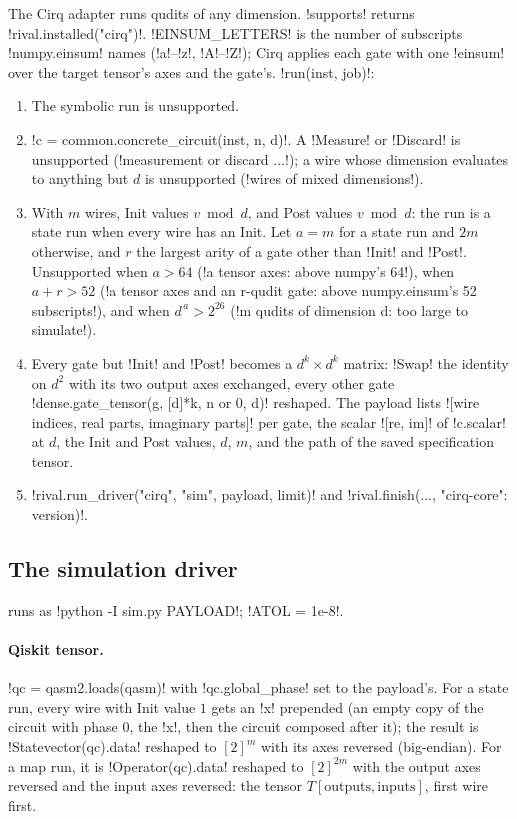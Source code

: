 The Cirq adapter runs qudits of any dimension. \py!supports! returns \py!rival.installed("cirq")!. \py!EINSUM_LETTERS! is the number of subscripts \py!numpy.einsum! names (\code!a!--\code!z!, \code!A!--\code!Z!); Cirq applies each gate with one \code!einsum! over the target tensor's axes and the gate's. \py!run(inst, job)!:
\begin{enumerate}
\item The symbolic run is unsupported.
\item \py!c = common.concrete_circuit(inst, n, d)!. A \py!Measure! or \py!Discard! is unsupported (\code!measurement or discard ...!); a wire whose dimension evaluates to anything but $d$ is unsupported (\code!wires of mixed dimensions!).
\item With $m$ wires, Init values $v\bmod d$, and Post values $v\bmod d$: the run is a state run when every wire has an Init. Let $a=m$ for a state run and $2m$ otherwise, and $r$ the largest arity of a gate other than \py!Init! and \py!Post!. Unsupported when $a>64$ (\code!a tensor axes: above numpy's 64!), when $a+r>52$ (\code!a tensor axes and an r-qudit gate: above numpy.einsum's 52 subscripts!), and when $d^{\,a}>2^{26}$ (\code!m qudits of dimension d: too large to simulate!).
\item Every gate but \py!Init! and \py!Post! becomes a $d^k\times d^k$ matrix: \py!Swap! the identity on $d^2$ with its two output axes exchanged, every other gate \py!dense.gate_tensor(g, [d]*k, n or 0, d)! reshaped. The payload lists \py![wire indices, real parts, imaginary parts]! per gate, the scalar \py![re, im]! of \py!c.scalar! at $d$, the Init and Post values, $d$, $m$, and the path of the saved specification tensor.
\item \py!rival.run_driver("cirq", "sim", payload, limit)! and \py!rival.finish(..., {"cirq-core": version})!.
\end{enumerate}

\subsection{The simulation driver}\label{sec:bench-tools-sim}

 runs as \code!python -I sim.py PAYLOAD!; \py!ATOL = 1e-8!.

\paragraph{Qiskit tensor.} \py!qc = qasm2.loads(qasm)! with \py!qc.global_phase! set to the payload's. For a state run, every wire with Init value $1$ gets an \code!x! prepended (an empty copy of the circuit with phase $0$, the \code!x!, then the circuit composed after it); the result is \py!Statevector(qc).data! reshaped to $[2]^m$ with its axes reversed (big-endian). For a map run, it is \py!Operator(qc).data! reshaped to $[2]^{2m}$ with the output axes reversed and the input axes reversed: the tensor $T[\text{outputs},\text{inputs}]$, first wire first.

